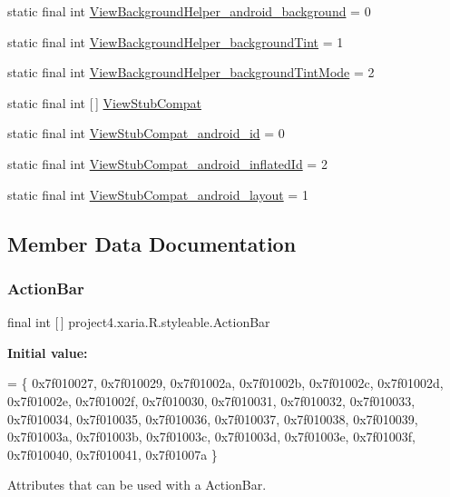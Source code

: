 \begin{DoxyCompactItemize}
\item 
static final int \hyperlink{classproject4_1_1xaria_1_1R_1_1styleable_a0efbf4a37a0cec8003711cb6b2677f7c}{View\+Background\+Helper\+\_\+android\+\_\+background} = 0
\item 
static final int \hyperlink{classproject4_1_1xaria_1_1R_1_1styleable_a27fac5a6cd4f1ec3ff5974130ad03ae1}{View\+Background\+Helper\+\_\+background\+Tint} = 1
\item 
static final int \hyperlink{classproject4_1_1xaria_1_1R_1_1styleable_a3f5b3d3cb488c190a6f2a6481b79de1d}{View\+Background\+Helper\+\_\+background\+Tint\+Mode} = 2
\item 
static final int \mbox{[}$\,$\mbox{]} \hyperlink{classproject4_1_1xaria_1_1R_1_1styleable_a4fd904903e273c876de7c4d8bcb8bd8e}{View\+Stub\+Compat}
\item 
static final int \hyperlink{classproject4_1_1xaria_1_1R_1_1styleable_a5e19e59ea90b0fb776887402c9ffef4d}{View\+Stub\+Compat\+\_\+android\+\_\+id} = 0
\item 
static final int \hyperlink{classproject4_1_1xaria_1_1R_1_1styleable_aed35f6f33d2063fd66044a9bdf7ce518}{View\+Stub\+Compat\+\_\+android\+\_\+inflated\+Id} = 2
\item 
static final int \hyperlink{classproject4_1_1xaria_1_1R_1_1styleable_a8256a8832d4f3ad9530b0fabe1403b69}{View\+Stub\+Compat\+\_\+android\+\_\+layout} = 1
\end{DoxyCompactItemize}


\subsection{Member Data Documentation}
\mbox{\label{classproject4_1_1xaria_1_1R_1_1styleable_accb530194c58ee3abb15587da8869e99}} 
\subsubsection{\texorpdfstring{Action\+Bar}{ActionBar}}
{\footnotesize\ttfamily final int \mbox{[}$\,$\mbox{]} project4.\+xaria.\+R.\+styleable.\+Action\+Bar\hspace{0.3cm}{\ttfamily [static]}}

{\bfseries Initial value\+:}
\begin{DoxyCode}
= \{
            0x7f010027, 0x7f010029, 0x7f01002a, 0x7f01002b,
            0x7f01002c, 0x7f01002d, 0x7f01002e, 0x7f01002f,
            0x7f010030, 0x7f010031, 0x7f010032, 0x7f010033,
            0x7f010034, 0x7f010035, 0x7f010036, 0x7f010037,
            0x7f010038, 0x7f010039, 0x7f01003a, 0x7f01003b,
            0x7f01003c, 0x7f01003d, 0x7f01003e, 0x7f01003f,
            0x7f010040, 0x7f010041, 0x7f01007a
        \}
\end{DoxyCode}
Attributes that can be used with a Action\+Bar. 

